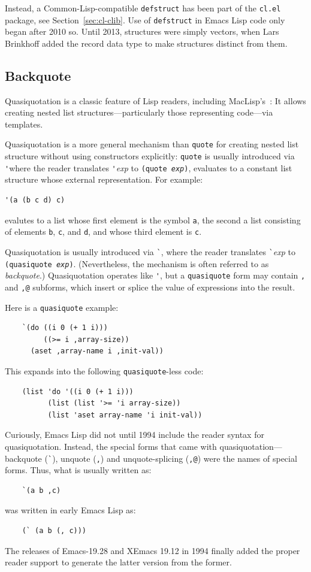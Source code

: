 \documentclass[format=acmsmall, review]{acmart}
\newcommand \Elisp {Emacs Lisp}
\begin{document}
Instead, a Common-Lisp-compatible \texttt{defstruct} has been part of
the \texttt{cl.el} package, see Section~\ref{sec:cl-clib}.  Use of
\texttt{defstruct} in \Elisp{} code only began after 2010 so.  Until
2013, structures were simply vectors, when Lars Brinkhoff added the
record data type to make structures distinct from them.

\subsection{Backquote}
\label{sec:backquote}

Quasiquotation is a classic feature of Lisp readers, including
MacLisp's~\cite{Bawden1999}: It allows creating nested list
structures---particularly those representing code---via templates.

Quasiquotation is a more general mechanism than \texttt{quote} for
creating nested list structure without using constructors explicitly:
\texttt{quote} is usually introduced via \verb|'|where the reader
translates \verb|'|\textit{exp} to \texttt{(quote \textit{exp})},
evaluates to a constant list structure whose external representation.
For example:
%
\begin{verbatim}
'(a (b c d) c)
\end{verbatim}
%
evalutes to a list whose first element is the symbol \texttt{a}, the
second a list consisting of elements \texttt{b}, \texttt{c}, and
\texttt{d}, and whose third element is \texttt{c}.

Quasiquotation is usually introduced via \verb|`|,
where the reader translates \verb|`|\textit{exp} to
\texttt{(quasiquote \textit{exp})}.  (Nevertheless, the mechanism is
often referred to as \textit{backquote}.)  Quasiquotation operates like
\verb|'|, but a \texttt{quasiquote} form may contain \texttt{,} and \texttt{,@}
subforms, which insert or splice the value of expressions into the
result.

Here is a \texttt{quasiquote} example:
%
\begin{verbatim}
    `(do ((i 0 (+ 1 i)))
         ((>= i ,array-size))
      (aset ,array-name i ,init-val))
\end{verbatim}
%
This expands into the following \texttt{quasiquote}-less code:
%
\begin{verbatim}
    (list 'do '((i 0 (+ 1 i)))
          (list (list '>= 'i array-size))
          (list 'aset array-name 'i init-val))
\end{verbatim}
%
Curiously, \Elisp{} did not until 1994 include the reader syntax for
quasiquotation.
Instead, the special forms that came with quasiquotation---backquote
(\verb|`|), unquote (\verb|,|) and unquote-splicing (\verb|,@|) were
the names of special forms.   Thus, what is usually written as:
\begin{verbatim}
    `(a b ,c)
\end{verbatim}
was written in early \Elisp{} as:
\begin{verbatim}
    (` (a b (, c)))
\end{verbatim}
The releases of Emacs-19.28 and XEmacs 19.12 in 1994 finally added the
proper reader support to generate the latter version from the former.
\end{document}
